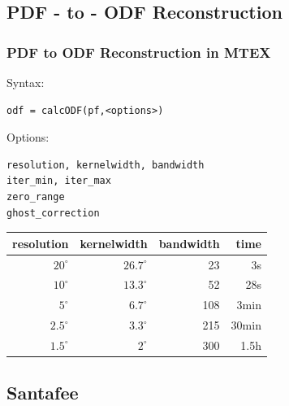 \documentclass{beamer}
\newcommand{\MTEX}{{\bf {\color{red}M}TEX\,}}%
\begin{document}
\begin{frame}[fragile]
\begin{columns}
\begin{column}{3.1cm}
{      }
    \end{column}

  \end{columns}

\end{frame}

\subsection*{PDF - to - ODF Reconstruction}


\begin{frame}[fragile]
  \frametitle{PDF to ODF Reconstruction in \MTEX}

  Syntax:
  \begin{alertenv}
\begin{lstlisting}
odf = calcODF(pf,<options>)
\end{lstlisting}
  \end{alertenv}

Options:
\begin{lstlisting}
resolution, kernelwidth, bandwidth
iter_min, iter_max
zero_range       
ghost_correction 
\end{lstlisting}

\pause

\begin{table}[H]
  \centering
  \begin{tabular}{r r r r}
    \toprule
    resolution & kernelwidth  & bandwidth & time \\
    \midrule
    $20^\circ$  & $26.7^\circ$ & 23  & 3s   \\
    $10^\circ$  & $13.3^\circ$ & 52  & 28s  \\
    $5^\circ$   & $6.7^\circ$  & 108 & 3min \\
    $2.5^\circ$ & $3.3^\circ$  & 215 & 30min\\
    $1.5^\circ$ & $2^\circ$    & 300 & 1.5h\\
    \bottomrule
  \end{tabular}  
\end{table}

\end{frame}


\subsection*{Santafee}
\end{document}
